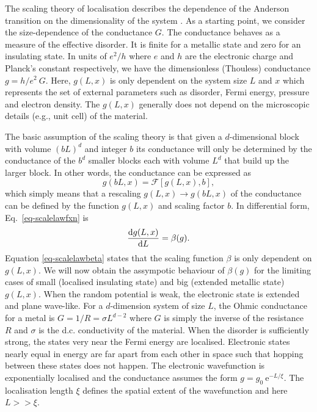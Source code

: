The scaling theory of localisation describes the dependence of the Anderson transition on the dimensionality of the system \cite{AbrALR79,MacK81,MacK83}.  
As a starting point, we consider the size-dependence of the conductance $G$.  The conductance behaves as a measure of the effective disorder.  It is finite for a metallic state and zero for an insulating state.  In units of $e^2/h$ where $e$ and $h$ are the electronic charge and Planck's constant respectively, we have the dimensionless (Thouless) conductance $g=h/e^2~G$.  Here, $g(L,x)$ is only dependent on the system size $L$ and $x$ which represents the set of external parameters such as disorder, Fermi energy, pressure and electron density.  The $g(L,x)$ generally does not depend on the microscopic details (e.g., unit cell) of the material.

The basic assumption of the scaling theory is that given a $d$-dimensional block with volume $(bL)^d$ and integer $b$ its conductance will only be determined by the conductance of the $b^d$ smaller blocks each with volume $L^d$ that build up the larger block.  In other words, the conductance can be expressed as
%
\begin{equation}
\label{eq-scalelawfxn}
 g(bL,x)=\mathcal{F}[g(L,x),b],
\end{equation}
%
which simply means that a rescaling $g(L,x)\rightarrow g(bL,x)$ of the conductance can be defined by the function $g(L,x)$ and scaling factor $b$.  In differential form, Eq.~\eqref{eq-scalelawfxn} is
%
\begin{equation}
\label{eq-scalelawbeta}
 \frac{\mathrm{d} g(L,x)}{\mathrm{d} L}=\beta(g).
\end{equation}
%
Equation \eqref{eq-scalelawbeta} states that the scaling function $\beta$ is only dependent on $g(L,x)$.  We will now obtain the assympotic behaviour of $\beta(g)$ for the limiting cases of small (localised insulating state) and big (extended metallic state) $g(L,x)$.  When the random potential is weak, the electronic state is extended and plane wave-like.  For a $d$-dimension system of size $L$, the Ohmic conductance for a metal is $G=1/R=\sigma L^{d-2}$ where $G$ is simply the inverse of the resistance $R$ and $\sigma$ is the d.c. conductivity of the material. 
  When the disorder is sufficiently strong, the states very near the Fermi energy are localised.  Electronic states nearly equal in energy are far apart from each other in space such that hopping between these states does not happen.
The electronic wavefunction is exponentially localised and the conductance assumes the form $g=g_0~\mathrm{e}^{-L/\xi}$.  The localisation length $\xi$ defines the spatial extent of the wavefunction and here $L>>\xi$.  

